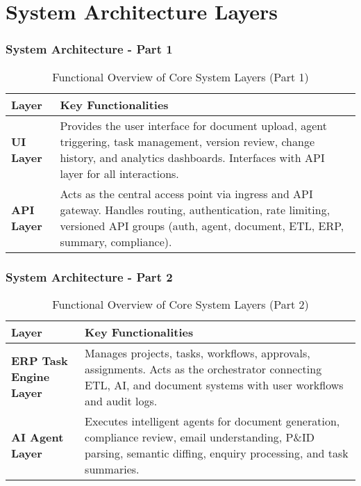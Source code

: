 \section{System Architecture Layers}
\begin{frame}
  \frametitle{System Architecture - Part 1}
 \begin{table}[h!]
\centering
\renewcommand{\arraystretch}{1.2}
\begin{tabular}{|p{3cm}|p{7cm}|}
\hline
\textbf{Layer} & \textbf{Key Functionalities} \\
\hline

\textbf{UI Layer} & 
Provides the user interface for document upload, agent triggering, task management, version review, change history, and analytics dashboards. Interfaces with API layer for all interactions. \\
\hline

\textbf{API Layer} & 
Acts as the central access point via ingress and API gateway. Handles routing, authentication, rate limiting, versioned API groups (auth, agent, document, ETL, ERP, summary, compliance). \\
\hline

\end{tabular}
\caption{Functional Overview of Core System Layers (Part 1)}
\end{table}
\end{frame}

\begin{frame}
  \frametitle{System Architecture - Part 2}
 \begin{table}[h!]
\centering
\renewcommand{\arraystretch}{1.2}
\begin{tabular}{|p{3cm}|p{7cm}|}
\hline
\textbf{Layer} & \textbf{Key Functionalities} \\
\hline

\textbf{ERP Task Engine Layer} & 
Manages projects, tasks, workflows, approvals, assignments. Acts as the orchestrator connecting ETL, AI, and document systems with user workflows and audit logs. \\
\hline

\textbf{AI Agent Layer} & 
Executes intelligent agents for document generation, compliance review, email understanding, P\&ID parsing, semantic diffing, enquiry processing, and task summaries. \\
\hline

\end{tabular}
\caption{Functional Overview of Core System Layers (Part 2)}
\end{table}
\end{frame}

